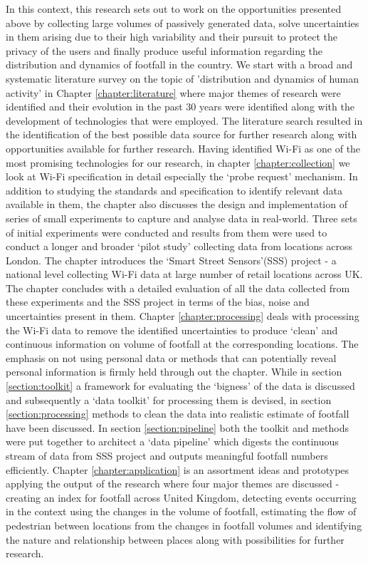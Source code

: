 In this context, this research sets out to work on the opportunities presented above by collecting large volumes of passively generated data, solve uncertainties in them arising due to their high variability and their pursuit to protect the privacy of the users and finally produce useful information regarding the distribution and dynamics of footfall in the country.
We start with a broad and systematic literature survey on the topic of 'distribution and dynamics of human activity' in Chapter \ref{chapter:literature} where major themes of research were identified and their evolution in the past 30 years were identified along with the development of technologies that were employed.
The literature search resulted in the identification of the best possible data source for further research along with opportunities available for further research.
Having identified Wi-Fi as one of the most promising technologies for our research, in chapter \ref{chapter:collection} we look at Wi-Fi specification in detail especially the `probe request' mechanism.
In addition to studying the standards and specification to identify relevant data available in them, the chapter also discusses the design and implementation of series of small experiments to capture and analyse data in real-world.
Three sets of initial experiments were conducted and results from them were used to conduct a longer and broader `pilot study' collecting data from locations across London.
The chapter introduces the `Smart Street Sensors'(SSS) project - a national level collecting Wi-Fi data at large number of retail locations across UK.
The chapter concludes with a detailed evaluation of all the data collected from these experiments and the SSS project in terms of the bias, noise and uncertainties present in them.
Chapter \ref{chapter:processing} deals with processing the Wi-Fi data to remove the identified uncertainties to produce `clean' and continuous information on volume of footfall at the corresponding locations.
The emphasis on not using personal data or methods that can potentially reveal personal information is firmly held through out the chapter.
While in section \ref{section:toolkit} a framework for evaluating the `bigness' of the data is discussed and subsequently a `data toolkit' for processing them is devised, in section \ref{section:processing} methods to clean the data into realistic estimate of footfall have been discussed.
In section \ref{section:pipeline} both the toolkit and methods were put together to architect a `data pipeline' which digests the continuous stream of data from SSS project and outputs meaningful footfall numbers efficiently.
Chapter \ref{chapter:application} is an assortment ideas and prototypes applying the output of the research where four major themes are discussed - creating an index for footfall across United Kingdom, detecting events occurring in the context using the changes in the volume of footfall, estimating the flow of pedestrian between locations from the changes in footfall volumes and identifying the nature  and relationship between places along with possibilities for further research.


